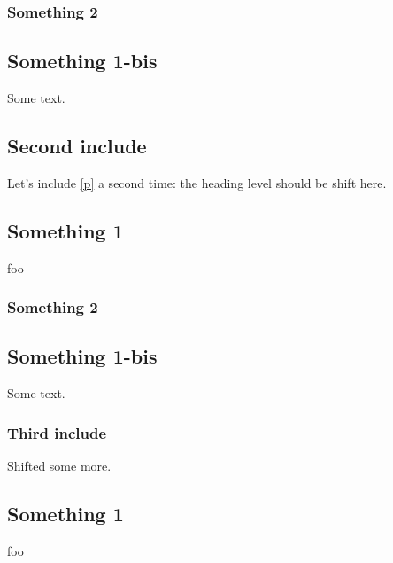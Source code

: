 \subsubsection{Something 2\label{Include_sections--something-2_2}}%
\subsection{Something 1-bis\label{Include_sections--something-1-bis_2}}%
Some text.

\subsection{Second include\label{Include_sections--second-include}}%
Let's include \hyperref[Include_sections-module-type-Something]{[p\pageref*{Include_sections-module-type-Something}]} a second time: the heading level should be shift here.

 \hyperref[Include_sections-module-type-Something]{}\subsection{Something 1\label{Include_sections--something-1_3}}%
foo

\subsubsection{Something 2\label{Include_sections--something-2_3}}%
\subsection{Something 1-bis\label{Include_sections--something-1-bis_3}}%
Some text.

\subsubsection{Third include\label{Include_sections--third-include}}%
Shifted some more.

 \hyperref[Include_sections-module-type-Something]{}\subsection{Something 1\label{Include_sections--something-1_4}}%
foo

